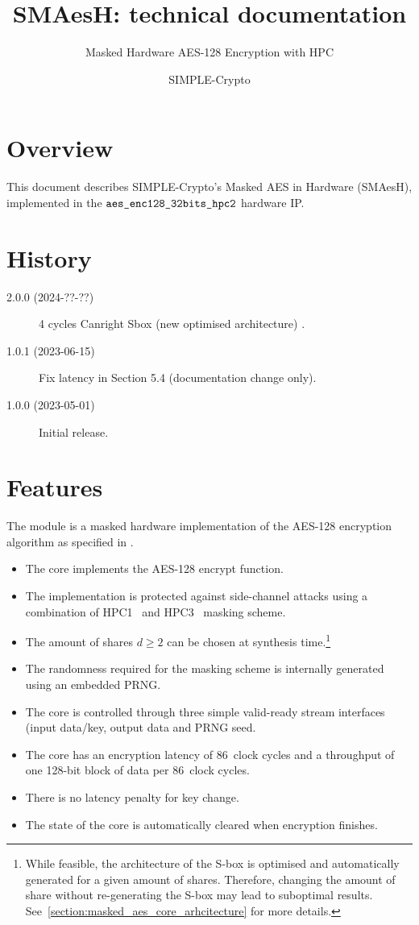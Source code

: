 \documentclass{scrartcl}
\title{SMAesH: technical documentation}
\subtitle{Masked Hardware AES-128 Encryption with HPC}
\author{SIMPLE-Crypto}
\date{}
\begin{document}


\maketitle

\tableofcontents

\section{Overview}
\label{section:overview}
This document describes SIMPLE-Crypto's Masked AES in Hardware (SMAesH),
implemented in the $\texttt{aes\_enc128\_32bits\_hpc2}$ hardware IP. 

\section{History}

\begin{description}
    \item[2.0.0 (2024-??-??)] 4 cycles Canright Sbox (new optimised architecture) .
    \item[1.0.1 (2023-06-15)] Fix latency in Section 5.4 (documentation change only).
    \item[1.0.0 (2023-05-01)] Initial release.
\end{description}

\section{Features}
The \core module is a masked hardware implementation of the AES-128 encryption
algorithm as specified in \cite{nist197}. 

\begin{itemize}
\item{The core implements the AES-128 encrypt function.}
\item{The implementation is protected against side-channel attacks using a combination of HPC1~\cite{DBLP:journals/tc/CassiersGLS21} and HPC3~\cite{DBLP:conf/ccs/Knichel022} masking scheme.}
\item{The amount of shares $d\ge 2$ can be chosen at synthesis time.\footnote{While feasible, the architecture of the S-box is optimised and automatically generated for a given amount of shares. Therefore, changing the amount of share without re-generating the S-box may lead to suboptimal results. See~\ref{section:masked_aes_core_arhcitecture} for more details.}}
\item{The randomness required for the masking scheme is internally generated using an embedded PRNG.}
\item{The core is controlled through three simple valid-ready stream interfaces (input data/key, output data and PRNG seed.}
\item{The core has an encryption latency of 86~clock cycles and a throughput of one 128-bit block of data per 86~clock cycles.}
\item{There is no latency penalty for key change.}
\item{The state of the core is automatically cleared when encryption finishes.}
\end{itemize}
\end{document}
